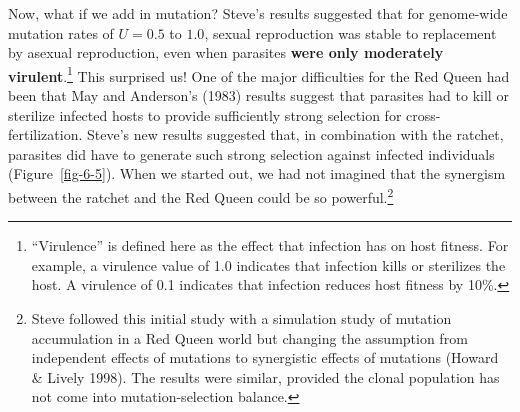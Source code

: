 \documentclass[
  letterpaper,
]{book}
\begin{document}
Now, what if we add in mutation? Steve's results suggested that for
genome-wide mutation rates of \(U = 0.5\) to \(1.0\), sexual
reproduction was stable to replacement by asexual reproduction, even
when parasites \textbf{were only moderately virulent}.\footnote{``Virulence''
  is defined here as the effect that infection has on host fitness. For
  example, a virulence value of 1.0 indicates that infection kills or
  sterilizes the host. A virulence of 0.1 indicates that infection
  reduces host fitness by 10\%.} This surprised us! One of the major
difficulties for the Red Queen had been that May and Anderson's (1983)
results suggest that parasites had to kill or sterilize infected hosts
to provide sufficiently strong selection for cross-fertilization.
Steve's new results suggested that, in combination with the ratchet,
parasites did have to generate such strong selection against infected
individuals (Figure~\ref{fig-6-5}). When we started out, we had not
imagined that the synergism between the ratchet and the Red Queen could
be so powerful.\footnote{Steve followed this initial study with a
  simulation study of mutation accumulation in a Red Queen world but
  changing the assumption from independent effects of mutations to
  synergistic effects of mutations (Howard \& Lively 1998). The results
  were similar, provided the clonal population has not come into
  mutation-selection balance.}
\end{document}
